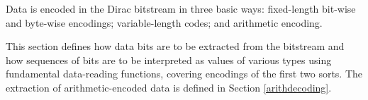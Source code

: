 Data is encoded in the Dirac bitstream in three basic ways: fixed-length
bit-wise and byte-wise encodings; variable-length codes; and arithmetic encoding.

This section defines how data bits are to be extracted from the bitstream and how
sequences of bits are to be interpreted as values of various types using fundamental
data-reading functions, covering encodings of the first two sorts. The extraction
of arithmetic-encoded data is defined in Section \ref{arithdecoding}.
